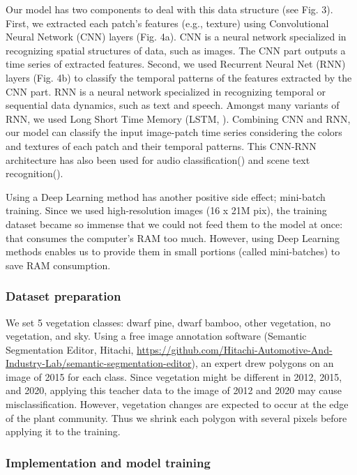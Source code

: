 \documentclass{article}
\begin{document}
Our model has two components to deal with this data structure (see Fig. 3). First, we extracted each patch's features (e.g., texture) using Convolutional Neural Network (CNN) layers (Fig. 4a). CNN is a neural network specialized in recognizing spatial structures of data, such as images. The CNN part outputs a time series of extracted features. Second, we used Recurrent Neural Net (RNN) layers (Fig. 4b) to classify the temporal patterns of the features extracted by the CNN part. RNN is a neural network specialized in recognizing temporal or sequential data dynamics, such as text and speech. Amongst many variants of RNN, we used Long Short Time Memory (LSTM, \cite{Hochreiter1997LSTM}). Combining CNN and RNN, our model can classify the input image-patch time series considering the colors and textures of each patch and their temporal patterns. This CNN-RNN architecture has also been used for audio classification(\cite{Shi2015CRNNtext}) and scene text recognition(\cite{Shi2015CRNNtext}).

Using a Deep Learning method has another positive side effect; mini-batch training. Since we used high-resolution images (16 x 21M pix), the training dataset became so immense that we could not feed them to the model at once: that consumes the computer's RAM too much. However, using Deep Learning methods enables us to provide them in small portions (called mini-batches) to save RAM consumption.

\hypertarget{dataset-preparation}{%
\subsubsection{Dataset preparation}\label{dataset-preparation}}

We set 5 vegetation classes: dwarf pine, dwarf bamboo, other vegetation, no vegetation, and sky. Using a free image annotation software (Semantic Segmentation Editor, Hitachi, \url{https://github.com/Hitachi-Automotive-And-Industry-Lab/semantic-segmentation-editor}), an expert drew polygons on an image of 2015 for each class. Since vegetation might be different in 2012, 2015, and 2020, applying this teacher data to the image of 2012 and 2020 may cause misclassification. However, vegetation changes are expected to occur at the edge of the plant community. Thus we shrink each polygon with several pixels before applying it to the training.

\hypertarget{implementation-and-model-training}{%
\subsubsection{Implementation and model training}\label{implementation-and-model-training}}
\end{document}
